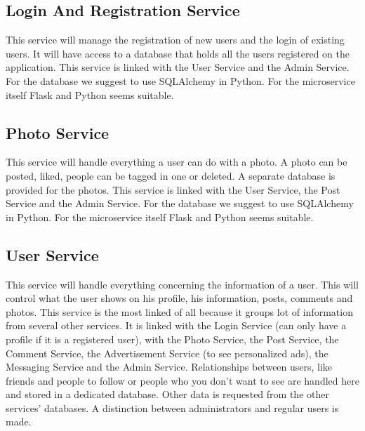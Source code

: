 \documentclass[a4paper,12pt]{article}
\begin{document}
\subsection{Login And Registration Service}

This service will manage the registration of new users and the login of existing users. It will have access to a database that holds all the users registered on the application.
\newline
\newline
This service is linked with the User Service and the Admin Service.
\newline
\newline
For the database we suggest to use SQLAlchemy in Python. For the microservice itself Flask and Python seems suitable.

\subsection{Photo Service}

This service will handle everything a user can do with a photo. A photo can be posted, liked, people can be tagged in one or deleted. A separate database is provided for the photos.
\newline
\newline
This service is linked with the User Service, the Post Service and the Admin Service.
\newline
\newline
For the database we suggest to use SQLAlchemy in Python. For the microservice itself Flask and Python seems suitable.

\subsection{User Service}

This service will handle everything concerning the information of a user. This will control what the user shows on his profile, his information, posts, comments and photos. This service is the most linked of all because it groups lot of information from several other services. It is linked with the Login Service (can only have a profile if it is a registered user), with the Photo Service, the Post Service, the Comment Service, the Advertisement Service (to see personalized ads), the Messaging Service and the Admin Service. Relationships between users, like friends and people to follow or people who you don't want to see are handled here and stored in a dedicated database. Other data is requested from the other services' databases.
\newline
\newline
A distinction between administrators and regular users is made.
\end{document}
